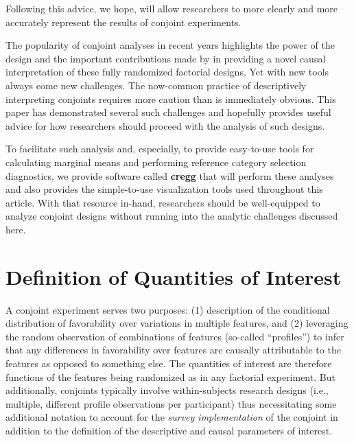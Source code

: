 \documentclass[a4paper,12pt]{article}\usepackage[]{graphicx}\usepackage[]{color}
\begin{document}
\noindent Following this advice, we hope, will allow researchers to more clearly and more accurately represent the results of conjoint experiments.

The popularity of conjoint analyses in recent years highlights the power of the design and the important contributions made by \citet{HainmuellerHopkinsYamamoto2014} in providing a novel causal interpretation of these fully randomized factorial designs. Yet with new tools always come new challenges. The now-common practice of descriptively interpreting conjoints requires more caution than is immediately obvious. This paper has demonstrated several such challenges and hopefully provides useful advice for how researchers should proceed with the analysis of such designs.

To facilitate such analysis and, especially, to provide easy-to-use tools for calculating marginal means and performing reference category selection diagnostics, we provide software called \textbf{cregg} \citep{Leeper2018cregg} that will perform these analyses and also provides the simple-to-use visualization tools used throughout this article. With that resource in-hand, researchers should be well-equipped to analyze conjoint designs without running into the analytic challenges discussed here.



\singlespacing


\clearpage


\appendix
\tableofcontents



\clearpage

\section{Definition of Quantities of Interest}

A conjoint experiment serves two purposes: (1) description of the conditional distribution of favorability over variations in multiple features, and (2) leveraging the random observation of combinations of features (so-called ``profiles'') to infer that any differences in favorability over features are causally attributable to the features as opposed to something else. The quantities of interest are therefore functions of the features being randomized as in any factorial experiment. But additionally, conjoints typically involve within-subjects research designs (i.e., multiple, different profile observations per participant) thus necessitating some additional notation to account for the \textit{survey implementation} of the conjoint in addition to the definition of the descriptive and causal parameters of interest.
\end{document}
